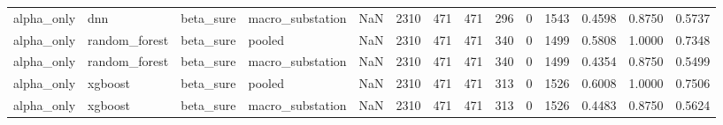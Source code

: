 \begin{tabular}{llllrrrrrrrrrr}
alpha_only & dnn & beta_sure & macro_substation & NaN & 2310 & 471 & 471 & 296 & 0 & 1543 & 0.4598 & 0.8750 & 0.5737 \\
alpha_only & random_forest & beta_sure & pooled & NaN & 2310 & 471 & 471 & 340 & 0 & 1499 & 0.5808 & 1.0000 & 0.7348 \\
alpha_only & random_forest & beta_sure & macro_substation & NaN & 2310 & 471 & 471 & 340 & 0 & 1499 & 0.4354 & 0.8750 & 0.5499 \\
alpha_only & xgboost & beta_sure & pooled & NaN & 2310 & 471 & 471 & 313 & 0 & 1526 & 0.6008 & 1.0000 & 0.7506 \\
alpha_only & xgboost & beta_sure & macro_substation & NaN & 2310 & 471 & 471 & 313 & 0 & 1526 & 0.4483 & 0.8750 & 0.5624 \\
\bottomrule
\end{tabular}
